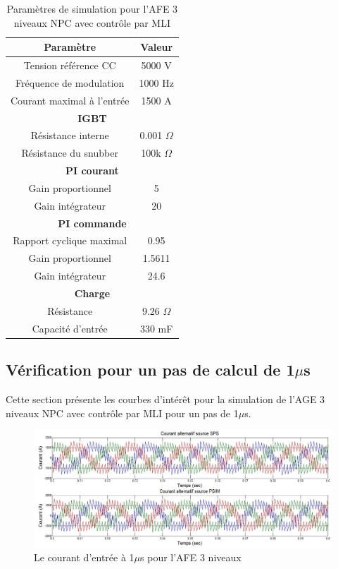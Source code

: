 \documentclass[11pt,letterpaper,final]{report}
\begin{document}
\begin{table}[htb]
\centering
\begin{tabular}{|c|c|} 
  \hline
  \textbf{Paramètre} & \textbf{Valeur}  \\
  \hline\hline
  Tension référence CC & 5000 V\\ \hline
  Fréquence de modulation & 1000 Hz \\ \hline
  Courant maximal à l'entrée& 1500 A \\ \hline \hline
  \multicolumn{2}{|c|}{\textbf{IGBT}}\\ \hline
  Résistance interne & 0.001 $\Omega$\\
  Résistance du snubber & 100k $\Omega$\\ \hline \hline
   \multicolumn{2}{|c|}{\textbf{PI courant}}\\ \hline
  Gain proportionnel & 5 \\
  Gain intégrateur & 20 \\ \hline \hline
  \multicolumn{2}{|c|}{\textbf{PI commande}}\\ \hline
  Rapport cyclique maximal & 0.95\\
  Gain proportionnel & 1.5611 \\
  Gain intégrateur & 24.6 \\ \hline \hline
  \multicolumn{2}{|c|}{\textbf{Charge}}\\ \hline
  Résistance & 9.26 $\Omega$ \\
  Capacité d'entrée & 330 mF\\
  \hline
\end{tabular}
\caption{Paramètres de simulation pour l'AFE 3 niveaux NPC avec contrôle par MLI}
\label{p_AF_3level}
\end{table}

\subsection{Vérification pour un pas de calcul de 1$\mu$s}
Cette section présente les courbes d'intérêt pour la simulation de l'AGE 3 niveaux NPC avec contrôle par MLI pour un pas de 1$\mu$s. 

\begin{figure}[htb]
\centering
\includegraphics[scale=0.5]{Fig/AFE3LEVEL/1u/cour_al.jpg}
\caption{Le courant d'entrée à 1$\mu$s pour l'AFE 3 niveaux}
\label{AF_3_cou}
\end{figure}
\end{document}
